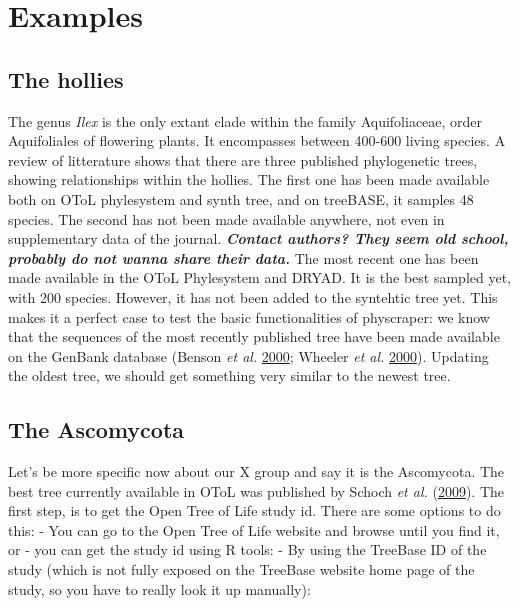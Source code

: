 \documentclass[]{article}
\begin{document}
\hypertarget{examples}{%
\section{Examples}\label{examples}}

\hypertarget{the-hollies}{%
\subsection{The hollies}\label{the-hollies}}

The genus \emph{Ilex} is the only extant clade within the family Aquifoliaceae, order Aquifoliales of flowering plants.
It encompasses between 400-600 living species. A review of litterature shows that there are three published phylogenetic trees, showing relationships within the hollies.
The first one has been made available both on OToL phylesystem and synth tree, and on treeBASE, it samples 48 species.
The second has not been made available anywhere, not even in supplementary data of the journal.
\textbf{\emph{Contact authors? They seem old school, probably do not wanna share their data.}}
The most recent one has been made available in the OToL Phylesystem and DRYAD. It is the best sampled yet, with 200 species. However,
it has not been added to the syntehtic tree yet.
This makes it a perfect case to test the basic functionalities of physcraper: we know that the sequences of the most recently published tree have been made available on the GenBank database (Benson \emph{et al.} \protect\hyperlink{ref-benson2000genbank}{2000}; Wheeler \emph{et al.} \protect\hyperlink{ref-wheeler2000database}{2000}). Updating the oldest tree, we should get something very similar to the newest tree.

\hypertarget{the-ascomycota}{%
\subsection{The Ascomycota}\label{the-ascomycota}}

Let's be more specific now about our X group and say it is the Ascomycota.
The best tree currently available in OToL was published by Schoch \emph{et al.} (\protect\hyperlink{ref-schoch2009ascomycota}{2009}).
The first step, is to get the Open Tree of Life study id. There are some options to do this:
- You can go to the Open Tree of Life website and browse until you find it, or
- you can get the study id using R tools:
- By using the TreeBase ID of the study (which is not fully exposed on the
TreeBase website home page of the study, so you have to really look it up manually):
\end{document}
